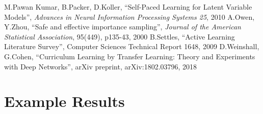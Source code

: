 \documentclass[a4paper,10.5pt]{article}
\begin{document}
\begin{thebibliography}{1}
M.Pawan Kumar, B.Packer, D.Koller, ``Self-Paced Learning for Latent Variable Models'', \textit{Advances in Neural Information Processing Systems 25}, 2010
A.Owen, Y.Zhou, ``Safe and effective importance sampling'', \textit{Journal of the American Statistical Association}, 95(449), p135-43, 2000
B.Settles, ``Active Learning Literature Survey'', Computer Sciences Technical Report 1648, 2009
D.Weinshall, G.Cohen, ``Curriculum Learning by Transfer Learning: Theory and Experiments with Deep Networks'', arXiv preprint, arXiv:1802.03796, 2018
\end{thebibliography}

\newpage

\appendix
\section{Example Results}
\end{document}
